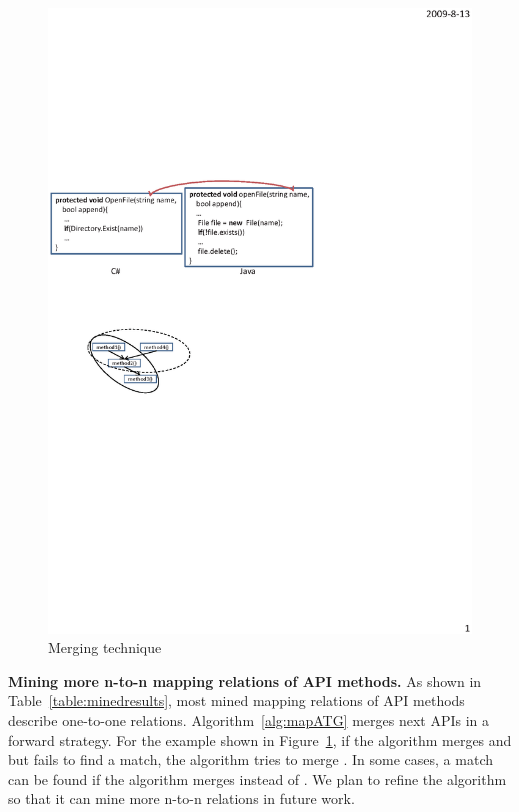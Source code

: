\begin{figure}[t]
\centering
\includegraphics[scale=1,clip]{figure/n2n.eps}\vspace*{-1.5ex}
 \caption{Merging technique}\vspace*{-3.5ex}
 \label{fig:n2n}
\end{figure}
\textbf{Mining more n-to-n mapping relations of API methods.} As
shown in Table~\ref{table:minedresults}, most mined mapping
relations of API methods describe one-to-one relations.
Algorithm~\ref{alg:mapATG} merges next APIs in a forward strategy.
For the example shown in Figure~\ref{fig:n2n}, if the algorithm
merges  and  but fails to find a
match, the algorithm tries to merge . In some
cases, a match can be found if the algorithm merges
 instead of . We plan to refine
the algorithm so that it can mine more n-to-n relations in future
work.

